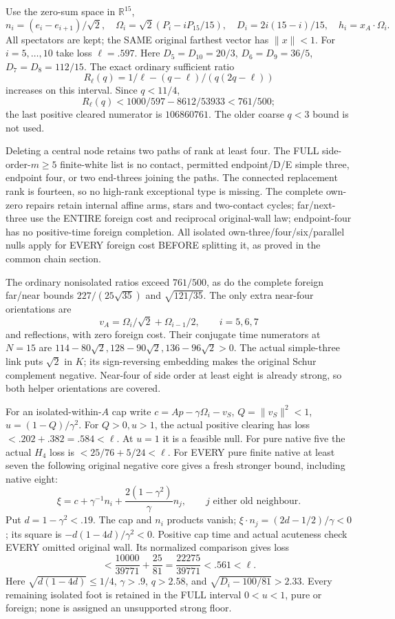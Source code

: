 \documentclass[11pt]{article}
\begin{document}
Use the zero-sum space in \(\mathbb R^{15}\),
\[
 n_i=(e_i-e_{i+1})/\sqrt2,\quad
 \Omega_i=\sqrt2(P_i-iP_{15}/15),\quad
 D_i=2i(15-i)/15,\quad h_i=x_A\cdot\Omega_i .
\]
All spectators are kept; the SAME original
farthest vector has \(\|x\|<1\).
For \(i=5,\ldots,10\) take loss
\(\ell=.597\).
Here \(D_5=D_{10}=20/3\),
\(D_6=D_9=36/5\), \(D_7=D_8=112/15\).
The exact ordinary sufficient ratio
\[
 R_\ell(q)=1/\ell-(q-\ell)/(q(2q-\ell))
\]
increases on this interval.
Since \(q<11/4\),
\[
 R_\ell(q)<1000/597-8612/53933<761/500 ;
\]
the last positive cleared numerator is \(106860761\).
The older coarse \(q<3\) bound is not used.

Deleting a central node retains two paths
of rank at least four.
The FULL side-order-\(m\ge5\) finite-white
list is no contact, permitted endpoint/D/E
simple three, endpoint four, or two end-threes
joining the paths.
The connected replacement rank is fourteen,
so no high-rank exceptional type is missing.
The complete own-zero repairs retain internal
affine arms, stars and two-contact cycles;
far/next-three use the ENTIRE foreign cost
and reciprocal original-wall law;
endpoint-four has no positive-time foreign
completion.
All isolated own-three/four/six/parallel nulls
apply for EVERY foreign cost BEFORE splitting it,
as proved in the common chain section.

The ordinary nonisolated ratios exceed \(761/500\),
as do the complete foreign far/near bounds
\(227/(25\sqrt{35})\) and \(\sqrt{121/35}\).
The only extra near-four orientations are
\[
                   v_A=\Omega_i/\sqrt2+\Omega_{i-1}/2,
                         \qquad i=5,6,7
\]
and reflections, with zero foreign cost.
Their conjugate time numerators at \(N=15\)
are
\(114-80\sqrt2,128-90\sqrt2,136-96\sqrt2>0\).
The actual simple-three link puts \(\sqrt2\)
in \(K\); its sign-reversing embedding makes
the original Schur complement negative.
Near-four of side order at least eight is
already strong, so both helper orientations
are covered.

For an isolated-within-\(A\) cap write
\(c=Ap-\gamma\Omega_i-v_S\),
\(Q=\|v_S\|^2<1\), \(u=(1-Q)/\gamma^2\).
For \(Q>0,u>1\), the actual positive clearing
has loss \(<.202+.382=.584<\ell\).
At \(u=1\) it is a feasible null.
For pure native five the actual \(H_4\)
loss is \(<25/76+5/24<\ell\).
For EVERY pure finite native at least seven
the following original negative core gives
a fresh stronger bound, including native eight:
\[
 \xi=c+\gamma^{-1}n_i+
                    {\frac{2(1-\gamma^2)}{\gamma}}n_j,
 \qquad j\text{ either old neighbour}.
\]
Put \(d=1-\gamma^2<.19\).
The cap and \(n_i\) products vanish;
\(\xi\cdot n_j=(2d-1/2)/\gamma<0\);
its square is \(-d(1-4d)/\gamma^2<0\).
Positive cap time and actual acuteness check
EVERY omitted original wall.
Its normalized comparison gives loss
\[
 <{\frac{10000}{39771}}+{\frac{25}{81}}
       ={\frac{22275}{39771}}<.561<\ell .
\]
Here \(\sqrt{d(1-4d)}\le1/4\),
\(\gamma>.9\), \(q>2.58\), and
\(\sqrt{D_i-100/81}>2.33\).
Every remaining isolated foot is retained in
the FULL interval \(0<u<1\), pure or foreign;
none is assigned an unsupported strong floor.
\end{document}
